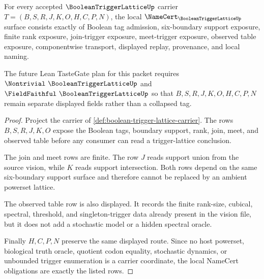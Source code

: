 \begin{theorem}
\label{thm:boolean-trigger-lattice-namecert-obligations}
For every accepted $\BooleanTriggerLatticeUp$ carrier $T=(B,S,R,J,K,O,H,C,P,N)$, the local $\NameCert_{\BooleanTriggerLatticeUp}$ surface consists exactly of Boolean tag admission, six-boundary support exposure, finite rank exposure, join-trigger exposure, meet-trigger exposure, observed table exposure, componentwise transport, displayed replay, provenance, and local naming.

The future Lean TasteGate plan for this packet requires $\Nontrivial\ \BooleanTriggerLatticeUp$ and $\FieldFaithful\ \BooleanTriggerLatticeUp$ so that $B,S,R,J,K,O,H,C,P,N$ remain separate displayed fields rather than a collapsed tag.
\end{theorem}
\begin{proof}
Project the carrier of \autoref{def:boolean-trigger-lattice-carrier}. The rows $B,S,R,J,K,O$ expose the Boolean tags, boundary support, rank, join, meet, and observed table before any consumer can read a trigger-lattice conclusion.

The join and meet rows are finite. The row $J$ reads support union from the source vision, while $K$ reads support intersection. Both rows depend on the same six-boundary support surface and therefore cannot be replaced by an ambient powerset lattice.

The observed table row is also displayed. It records the finite rank-size, cubical, spectral, threshold, and singleton-trigger data already present in the vision file, but it does not add a stochastic model or a hidden spectral oracle.

Finally $H,C,P,N$ preserve the same displayed route. Since no host powerset, biological truth oracle, quotient codon equality, stochastic dynamics, or unbounded trigger enumeration is a carrier coordinate, the local NameCert obligations are exactly the listed rows.
\end{proof}



